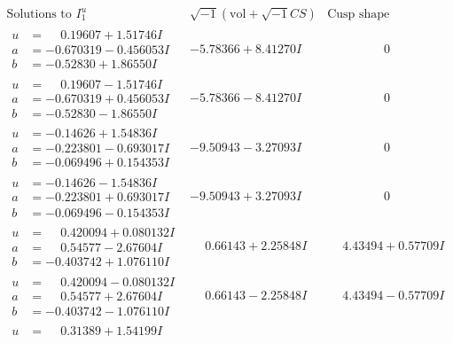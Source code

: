 \documentclass[1p]{elsarticle_modified}
\theoremstyle{definition}
\newcommand{\I}{\sqrt{-1}}
\begin{document}
$$\begin{array}{c|c|c}
\text{Solutions to }I^u_{1}& \I (\text{vol} + \sqrt{-1}CS) & \text{Cusp shape}\\
 \hline 
\begin{aligned}
u &= \phantom{-}0.19607 + 1.51746 I \\
a &= -0.670319 - 0.456053 I \\
b &= -0.52830 + 1.86550 I\end{aligned}
 & -5.78366 + 8.41270 I & \phantom{-0.000000 } 0 \\ \hline\begin{aligned}
u &= \phantom{-}0.19607 - 1.51746 I \\
a &= -0.670319 + 0.456053 I \\
b &= -0.52830 - 1.86550 I\end{aligned}
 & -5.78366 - 8.41270 I & \phantom{-0.000000 } 0 \\ \hline\begin{aligned}
u &= -0.14626 + 1.54836 I \\
a &= -0.223801 - 0.693017 I \\
b &= -0.069496 + 0.154353 I\end{aligned}
 & -9.50943 - 3.27093 I & \phantom{-0.000000 } 0 \\ \hline\begin{aligned}
u &= -0.14626 - 1.54836 I \\
a &= -0.223801 + 0.693017 I \\
b &= -0.069496 - 0.154353 I\end{aligned}
 & -9.50943 + 3.27093 I & \phantom{-0.000000 } 0 \\ \hline\begin{aligned}
u &= \phantom{-}0.420094 + 0.080132 I \\
a &= \phantom{-}0.54577 - 2.67604 I \\
b &= -0.403742 + 1.076110 I\end{aligned}
 & \phantom{-}0.66143 + 2.25848 I & \phantom{-}4.43494 + 0.57709 I \\ \hline\begin{aligned}
u &= \phantom{-}0.420094 - 0.080132 I \\
a &= \phantom{-}0.54577 + 2.67604 I \\
b &= -0.403742 - 1.076110 I\end{aligned}
 & \phantom{-}0.66143 - 2.25848 I & \phantom{-}4.43494 - 0.57709 I \\ \hline\begin{aligned}
u &= \phantom{-}0.31389 + 1.54199 I \\

\end{aligned}
\end{array}$$
\end{document}
